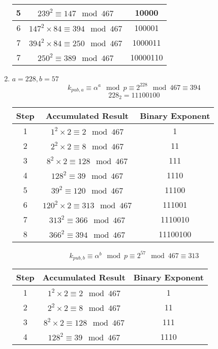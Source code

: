 \documentclass{math}
\begin{document}
\begin{enumerate}
\begin{center}
\begin{tabular}{|c|c|c|}
      \hline
      5 & \( 239^2 \equiv 147\mod467 \) & 10000 \\
      \hline
      6 & \( 147^2\times84 \equiv 394\mod467 \) & 100001 \\
      \hline
      7 & \( 394^2\times84 \equiv 250\mod467 \) & 1000011 \\
      \hline
      7 & \( 250^2 \equiv 389\mod467 \) & 10000110 \\
      \hline
    \end{tabular}
  \end{center}
  \item \( a = 228, b = 57 \)
  \[ k_{pub,a} \equiv \alpha^a\mod p \equiv 2^{228}\mod467 \equiv 394 \]
  \[ 228_2 = 11100100 \]
  \begin{center}
    \begin{tabular}{|c|c|c|}
      \hline
      Step & Accumulated Result & Binary Exponent \\
      \hline
      1 & \( 1^2\times2 \equiv 2\mod467 \) & 1 \\
      \hline
      2 & \( 2^2\times2 \equiv 8\mod467 \) & 11 \\
      \hline
      3 & \( 8^2\times2 \equiv 128\mod467 \) & 111 \\
      \hline
      4 & \( 128^2 \equiv 39\mod467 \) & 1110 \\
      \hline
      5 & \( 39^2 \equiv 120\mod467 \) & 11100 \\
      \hline
      6 & \( 120^2\times2 \equiv 313\mod467 \) & 111001 \\
      \hline
      7 & \( 313^2 \equiv 366\mod467 \) & 1110010 \\
      \hline
      8 & \( 366^2 \equiv 394\mod467 \) & 11100100 \\
      \hline
    \end{tabular}
  \end{center}
  \[ k_{pub,b} \equiv \alpha^b\mod p \equiv 2^{57}\mod467 \equiv 313 \]
  \begin{center}
    \begin{tabular}{|c|c|c|}
      \hline
      Step & Accumulated Result & Binary Exponent \\
      \hline
      1 & \( 1^2\times2 \equiv 2\mod467 \) & 1 \\
      \hline
      2 & \( 2^2\times2 \equiv 8\mod467 \) & 11 \\
      \hline
      3 & \( 8^2\times2 \equiv 128\mod467 \) & 111 \\
      \hline
      4 & \( 128^2 \equiv 39\mod467 \) & 1110 \\

\end{tabular}
\end{center}
\end{enumerate}
\end{document}
